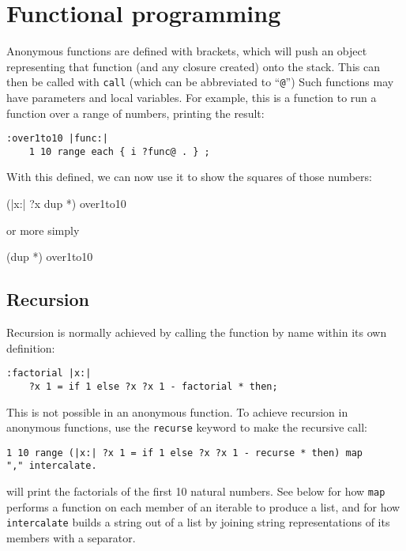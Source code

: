 \section{Functional programming}
\label{functional}
\indw{(}\indw{)}
Anonymous functions are defined with brackets, which will push an object
representing that function (and any closure created) onto the stack. This can
then be called with \texttt{call}  (which can be abbreviated to ``\texttt{@}'')
Such functions may have parameters and local variables.
For example, this is a function to run a function over a range of numbers,
printing the result:
\begin{lstlisting}
:over1to10 |func:|
    1 10 range each { i ?func@ . } ;
\end{lstlisting}
With this defined, we can now use it to show the squares of those
numbers:        
\begin{v}
    (|x:| ?x dup *) over1to10
\end{v}
or more simply
\begin{v}
    (dup *) over1to10
\end{v}

\subsection{Recursion}
Recursion is normally achieved by calling the function by name within
its own definition:
\begin{lstlisting}
:factorial |x:|
    ?x 1 = if 1 else ?x ?x 1 - factorial * then;
\end{lstlisting}
This is not possible in an anonymous function. To achieve recursion
in anonymous functions, use the
\texttt{recurse} keyword to make the recursive call:
\begin{lstlisting}
1 10 range (|x:| ?x 1 = if 1 else ?x ?x 1 - recurse * then) map
"," intercalate.
\end{lstlisting}
will print the factorials of the first 10 natural numbers. See below
for how \texttt{map} performs a function on each member of an iterable
to produce a list, and for how \texttt{intercalate} builds a string
out of a list by joining string representations of its members with
a separator.
